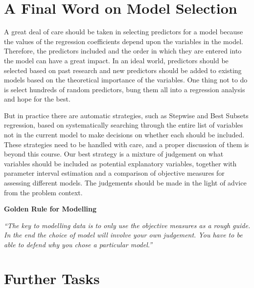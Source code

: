 \documentclass[]{article}
\begin{document}
\newpage

\section{A Final Word on Model Selection}\label{sec:Final}

A great deal of care should be taken in selecting predictors for a model
because the values of the regression coefficients depend upon the
variables in the model. Therefore, the predictors included and the order
in which they are entered into the model can have a great impact. In an
ideal world, predictors should be selected based on past research and
new predictors should be added to existing models based on the
theoretical importance of the variables. One thing not to do is select
hundreds of random predictors, bung them all into a regression analysis
and hope for the best.

But in practice there are automatic strategies, such as Stepwise and
Best Subsets regression, based on systematically searching through the
entire list of variables not in the current model to make decisions on
whether each should be included. These strategies need to be handled
with care, and a proper discussion of them is beyond this course. Our
best strategy is a mixture of judgement on what variables should be
included as potential explanatory variables, together with parameter
interval estimation and a comparison of objective measures for assessing
different models. The judgements should be made in the light of advice
from the problem context.

\textbf{Golden Rule for Modelling}

\emph{``The key to modelling data is to only use the objective measures
as a rough guide. In the end the choice of model will involve your own
judgement. You have to be able to defend why you chose a particular
model.''}

\newpage

\section{Further Tasks}\label{sec:Further}
\end{document}
